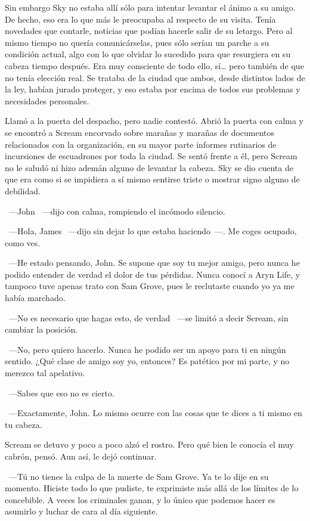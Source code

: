 Sin embargo Sky no estaba allí sólo para intentar levantar el ánimo a su amigo. De hecho, eso era lo que más le preocupaba al respecto de su visita. Tenía novedades que contarle, noticias que podían hacerle salir de su letargo. Pero al mismo tiempo no quería comunicárselas, pues sólo serían un parche a su condición actual, algo con lo que olvidar lo sucedido para que resurgiera en su cabeza tiempo después. Era muy consciente de todo ello, sí… pero también de que no tenía elección real. Se trataba de la ciudad que ambos, desde distintos lados de la ley, habían jurado proteger, y eso estaba por encima de todos sus problemas y necesidades personales.

Llamó a la puerta del despacho, pero nadie contestó. Abrió la puerta con calma y se encontró a Scream encorvado sobre marañas y marañas de documentos relacionados con la organización, en su mayor parte informes rutinarios de incursiones de escuadrones por toda la ciudad. Se sentó frente a él, pero Scream no le saludó ni hizo ademán alguno de levantar la cabeza. Sky se dio cuenta de que era como si se impidiera a sí mismo sentirse triste o mostrar signo alguno de debilidad.

~---John ~---dijo con calma, rompiendo el incómodo silencio.

~---Hola, James ~---dijo sin dejar lo que estaba haciendo~---. Me coges ocupado, como ves.

~---He estado pensando, John. Se supone que soy tu mejor amigo, pero nunca he podido entender de verdad el dolor de tus pérdidas. Nunca conocí a Aryn Life, y tampoco tuve apenas trato con Sam Grove, pues le reclutaste cuando yo ya me había marchado.

~---No es necesario que hagas esto, de verdad ~---se limitó a decir Scream, sin cambiar la posición.

~---No, pero quiero hacerlo. Nunca he podido ser un apoyo para ti en ningún sentido. ¿Qué clase de amigo soy yo, entonces? Es patético por mi parte, y no merezco tal apelativo.

~---Sabes que eso no es cierto.

~---Exactamente, John. Lo mismo ocurre con las cosas que te dices a ti mismo en tu cabeza.

Scream se detuvo y poco a poco alzó el rostro. Pero qué bien le conocía el muy cabrón, pensó. Aun así, le dejó continuar.

~---Tú no tienes la culpa de la muerte de Sam Grove. Ya te lo dije en su momento. Hiciste todo lo que pudiste, te exprimiste más allá de los límites de lo concebible. A veces los criminales ganan, y lo único que podemos hacer es asumirlo y luchar de cara al día siguiente.

